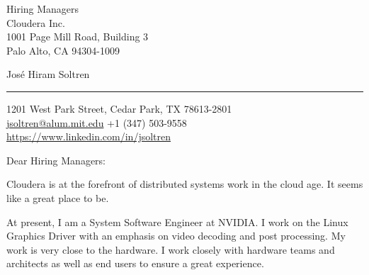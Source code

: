 \documentclass{letter} %
\begin{document}
\signature{Jos\'e Hiram Soltren}           %
\longindentation=0pt                       %
\let\raggedleft\raggedright                %
 
 
\begin{letter}{Hiring Managers\\
Cloudera Inc.\\
1001 Page Mill Road, Building 3\\ 
Palo Alto, CA 94304-1009}
    
\begin{flushleft}
{\LARGE\sffamily Jos\'e Hiram Soltren}
\end{flushleft}
\medskip\hrule height 1pt
\begin{flushright}
\hfill 1201 West Park Street, Cedar Park, TX 78613-2801 \\
\hfill {} \href{mailto:jsoltren@alum.mit.edu}{jsoltren@alum.mit.edu}
        +1 (347) 503-9558 \\
\hfill {} \url{https://www.linkedin.com/in/jsoltren}
\end{flushright} 
\vfill %

 
\opening{Dear Hiring Managers:} 
 

Cloudera is at the forefront of distributed systems work in the cloud age.
It seems like a great place to be.
 

At present, I am a System Software Engineer at NVIDIA. I work on the Linux
Graphics Driver with an emphasis on video decoding and post processing. My
work is very close to the hardware. I work closely with hardware teams and
architects as well as end users to ensure a great experience.


\end{letter}
\end{document}
